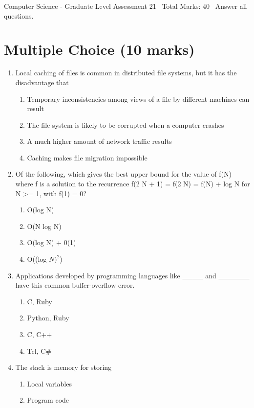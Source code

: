 \documentclass[12pt]{article}
\begin{document}
\begin{center}
Computer Science - Graduate Level Assessment 21 \
Total Marks: 40 \
Answer all questions.
\end{center}

\section*{Multiple Choice (10 marks)}
\begin{enumerate}[label=\arabic*.]
\item Local caching of files is common in distributed file systems, but it has the disadvantage that
\begin{enumerate}[label=(\alph*)]
    \item Temporary inconsistencies among views of a file by different machines can result
    \item The file system is likely to be corrupted when a computer crashes
    \item A much higher amount of network traffic results
    \item Caching makes file migration impossible
\end{enumerate}
\item Of the following, which gives the best upper bound for the value of f(N) where f is a solution to the recurrence f(2 N + 1) = f(2 N) = f(N) + log N for N \textgreater{}= 1, with f(1) = 0?
\begin{enumerate}[label=(\alph*)]
    \item O(log N)
    \item O(N log N)
    \item O(log N) + 0(1)
    \item O((log $N)^2$)
\end{enumerate}
\item Applications developed by programming languages like \_\_\_\_ and \_\_\_\_\_\_ have this common buffer-overflow error.
\begin{enumerate}[label=(\alph*)]
    \item C, Ruby
    \item Python, Ruby
    \item C, C++
    \item Tcl, C\#
\end{enumerate}
\item The stack is memory for storing
\begin{enumerate}[label=(\alph*)]
    \item Local variables
    \item Program code

\end{enumerate}
\end{enumerate}
\end{document}
